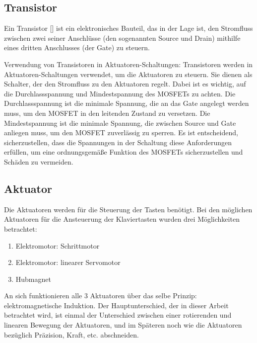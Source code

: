 \subsection{Transistor}
Ein Transistor [\cite*[siehe ]{BipolarerTransistor}] ist ein elektronisches Bauteil, das in der Lage ist, den Stromfluss zwischen zwei seiner Anschlüsse
(den sogenannten Source und Drain) mithilfe eines dritten Anschlusses (der Gate) zu steuern.

Verwendung von Transistoren in Aktuatoren-Schaltungen:
Transistoren werden in Aktuatoren-Schaltungen verwendet, um die Aktuatoren
zu steuern. Sie dienen als Schalter, der den Stromfluss zu den Aktuatoren regelt.
Dabei ist es wichtig, auf die Durchlassspannung und Mindestspannung des MOSFETs zu achten. Die Durchlassspannung ist die
minimale Spannung, die an das Gate angelegt werden muss, um den MOSFET in den leitenden Zustand zu versetzen. Die
Mindestspannung ist die minimale Spannung, die zwischen Source und Gate anliegen muss, um den MOSFET zuverlässig zu
sperren.
Es ist entscheidend, sicherzustellen, dass die Spannungen in der Schaltung diese Anforderungen erfüllen, um
eine ordnungsgemäße Funktion des MOSFETs sicherzustellen und Schäden zu vermeiden.


\subsection{Aktuator}\label{subsec:aktuator}

Die Aktuatoren werden für die Steuerung der Tasten benötigt.
Bei den möglichen Aktuatoren für die Ansteuerung der Klaviertasten wurden drei Möglichkeiten betrachtet: %
\begin{enumerate}
	\item Elektromotor: Schrittmotor
	\item Elektromotor: linearer Servomotor
	\item Hubmagnet
\end{enumerate}

An sich funktionieren alle 3 Aktuatoren über das selbe Prinzip: elektromagnetische Induktion.
Der Hauptunterschied, der in dieser Arbeit betrachtet wird, ist einmal der Unterschied zwischen einer rotierenden und linearen Bewegung der Aktuatoren,
und im Späteren noch wie die Aktuatoren bezüglich Präzision, Kraft, etc. abschneiden.

